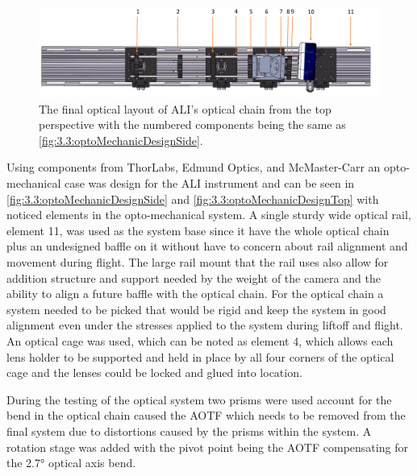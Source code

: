 \begin{figure}[h!]
    \begin{center}
    \includegraphics[width=1.0\textwidth]{./Images/3-3-OptoMechanicalSolidWorksLayoutTop.pdf}
    \caption[ALI's Opto-mechanical Layout (Top)]{The final optical layout of ALI's optical chain from the top perspective with the numbered components being the same as \autoref{fig:3.3:optoMechanicDesignSide}.}
   \label{fig:3.3:optoMechanicDesignTop}
    \end{center}
\end{figure}

Using components from ThorLabs, Edmund Optics, and McMaster-Carr an opto-mechanical case was design for the ALI instrument and can be seen in \autoref{fig:3.3:optoMechanicDesignSide} and \autoref{fig:3.3:optoMechanicDesignTop} with noticed elements in the opto-mechanical system. A single sturdy wide optical rail, element 11, was used as the system base since it have the whole optical chain plus an undesigned baffle on it without have to concern about rail alignment and movement during flight. The large rail mount that the rail uses also allow for addition structure and support needed by the weight of the camera and the ability to align a future baffle with the optical chain. For the optical chain a system needed to be picked that would be rigid and keep the system in good alignment even under the stresses applied to the system during liftoff and flight. An optical cage was used, which can be noted as element 4, which allows each lens holder to be supported and held in place by all four corners of the optical cage and the lenses could be locked and glued into location.

During the testing of the optical system two prisms were used account for the bend in the optical chain caused the AOTF which needs to be removed from the final system due to distortions caused by the prisms within the system. A rotation stage was added with the pivot point being the AOTF compensating for the 2.7\si{\degree} optical axis bend.

